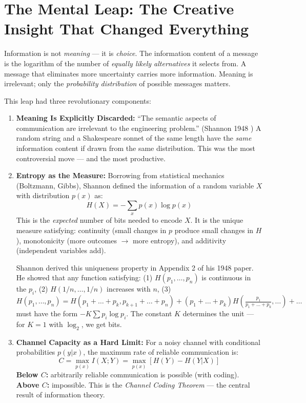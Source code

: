 \section{The Mental Leap: The Creative Insight That Changed Everything}
\label{sec:information:leap}

Information is not \emph{meaning} — it is \emph{choice}. The information content of a message is the logarithm of the number of \emph{equally likely alternatives} it selects from. A message that eliminates more uncertainty carries more information. Meaning is irrelevant; only the \emph{probability distribution} of possible messages matters.

This leap had three revolutionary components:

\begin{enumerate}
\item \textbf{Meaning Is Explicitly Discarded:} ``The semantic aspects of communication are irrelevant to the engineering problem.'' (Shannon 1948 \cite{Shannon1948}) A random string and a Shakespeare sonnet of the same length have the \emph{same} information content if drawn from the same distribution. This was the most controversial move --- and the most productive.

\item \textbf{Entropy as the Measure:} Borrowing from statistical mechanics (Boltzmann, Gibbs), Shannon defined the information of a random variable $X$ with distribution $p(x)$ as:
\[
H(X) = -\sum_x p(x) \log p(x)
\]
This is the \emph{expected} number of bits needed to encode $X$. It is the unique measure satisfying: continuity (small changes in $p$ produce small changes in $H$), monotonicity (more outcomes $\to$ more entropy), and additivity (independent variables add).

Shannon derived this uniqueness property in Appendix 2 of his 1948 paper. He showed that any function satisfying: (1) $H(p_1,\dots,p_n)$ is continuous in the $p_i$, (2) $H(1/n,\dots,1/n)$ increases with $n$, (3) $H(p_1,\dots,p_n) = H(p_1+\dots+p_k, p_{k+1}+\dots+p_n) + (p_1+\dots+p_k)H(\frac{p_1}{p_1+\dots+p_k},\dots) + \dots$ must have the form $-K\sum p_i\log p_i$. The constant $K$ determines the unit — for $K=1$ with $\log_2$, we get bits.

\item \textbf{Channel Capacity as a Hard Limit:} For a noisy channel with conditional probabilities $p(y|x)$, the maximum rate of reliable communication is:
\[
C = \max_{p(x)} I(X;Y) = \max_{p(x)} [H(Y) - H(Y|X)]
\]
\textbf{Below $C$:} arbitrarily reliable communication is possible (with coding). \textbf{Above $C$:} impossible. This is the \emph{Channel Coding Theorem} — the central result of information theory.
\end{enumerate}

